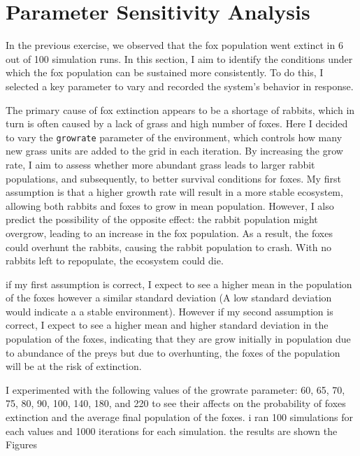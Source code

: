 \section{Parameter Sensitivity Analysis }

In the previous exercise, we observed that the fox population went extinct in 6 out of 100 simulation runs. In this section, I aim to identify the conditions under which the fox population can be sustained more consistently. To do this, I selected a key parameter to vary and recorded the system's behavior in response.

The primary cause of fox extinction appears to be a shortage of rabbits, which in turn is often caused by a lack of grass and high number of foxes. Here I decided to vary the \texttt{growrate} parameter of the environment, which controls how many new grass units are added to the grid in each iteration. By increasing the grow rate, I aim to assess whether more abundant grass leads to larger rabbit populations, and subsequently, to better survival conditions for foxes.
My first assumption is that a higher growth rate will result in a more stable ecosystem, allowing both rabbits and foxes to grow in mean population. However, I also predict the possibility of the opposite effect: the rabbit population might overgrow, leading to an increase in the fox population. As a result, the foxes could overhunt the rabbits, causing the rabbit population to crash. With no rabbits left to repopulate, the ecosystem could die.

if my first assumption is correct, I expect to see a higher mean in the population of the foxes however a similar standard deviation (A low standard deviation would indicate a a stable environment). However if my second assumption is correct, I expect to see a higher mean and higher standard deviation in the population of the foxes, indicating that they are grow initially in population due to abundance of the preys but due to overhunting, the foxes of the population will be at the risk of extinction.

I experimented with the following values of the growrate parameter: 60, 65, 70, 75, 80, 90, 100, 140, 180, and 220 to see their affects on the probability of foxes extinction and the average final population of the foxes. i ran 100 simulations for each values and 1000 iterations for each simulation. the results are shown the Figures  